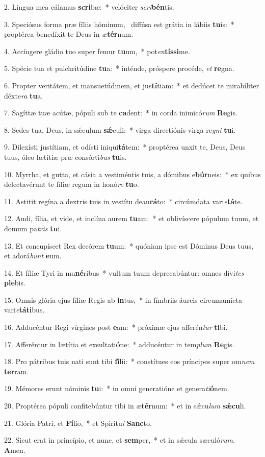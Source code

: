 2. Lingua mea cálamus \textbf{scri}bæ:~*  velóciter \textit{scri}\textbf{bén}tis.\

3. Speciósus forma præ fíliis hóminum, \dag\  diffúsa est grátia in lábiis \textbf{tu}is:~*  proptérea benedíxit te Deus in \textit{æ}\textbf{tér}num.\

4. Accíngere gládio tuo super femur \textbf{tu}um,~*  pot\textit{en}\textbf{tís}\textbf{si}me.\

5. Spécie tua et pulchritúdine \textbf{tu}a:~*  inténde, próspere procéde, \textit{et} \textbf{re}gna.\

6. Propter veritátem, et mansuetúdinem, et jus\textbf{tí}tiam:~*  et dedúcet te mirabíliter déxte\textit{ra} \textbf{tu}a.\

7. Sagíttæ tuæ acútæ, pópuli sub te \textbf{ca}dent:~*  in corda inimicó\textit{rum} \textbf{Re}gis.\

8. Sedes tua, Deus, in sǽculum \textbf{sǽ}culi:~*  virga directiónis virga re\textit{gni} \textbf{tu}i.\

9. Dilexísti justítiam, et odísti iniqui\textbf{tá}tem:~*  proptérea unxit te, Deus, Deus tuus, óleo lætítiæ præ consórti\textit{bus} \textbf{tu}is.\

10. Myrrha, et gutta, et cásia a vestiméntis tuis, a dómibus e\textbf{búr}neis:~*  ex quibus delectavérunt te fíliæ regum in honó\textit{re} \textbf{tu}o.\

11. Astitit regína a dextris tuis in vestítu deau\textbf{rá}to:~*  circúmdata vari\textit{e}\textbf{tá}te.\

12. Audi, fília, et vide, et inclína aurem \textbf{tu}am:~*  et oblivíscere pópulum tuum, et domum pa\textit{tris} \textbf{tu}i.\

13. Et concupíscet Rex decórem \textbf{tu}um:~*  quóniam ipse est Dóminus Deus tuus, et adorá\textit{bunt} \textbf{e}um.\

14. Et fíliæ Tyri in mu\textbf{né}ribus~*  vultum tuum deprecabúntur: omnes dívi\textit{tes} \textbf{ple}bis.\

15. Omnis glória ejus fíliæ Regis ab \textbf{in}tus,~*  in fímbriis áureis circumamícta vari\textit{e}\textbf{tá}\textbf{ti}bus.\

16. Adducéntur Regi vírgines post \textbf{e}am:~*  próximæ ejus afferén\textit{tur} \textbf{ti}bi.\

17. Afferéntur in lætítia et exsultati\textbf{ó}ne:~*  adducéntur in tem\textit{plum} \textbf{Re}gis.\

18. Pro pátribus tuis nati sunt tibi \textbf{fí}lii:~*  constítues eos príncipes super om\textit{nem} \textbf{ter}ram.\

19. Mémores erunt nóminis \textbf{tu}i:~*  in omni generatióne et genera\textit{ti}\textbf{ó}nem.\

20. Proptérea pópuli confitebúntur tibi in æ\textbf{tér}num:~*  et in sǽcu\textit{lum} \textbf{sǽ}\textbf{cu}li.\

21. Glória Patri, et \textbf{Fí}lio,~*  et Spirítu\textit{i} \textbf{Sanc}to.\

22. Sicut erat in princípio, et nunc, et \textbf{sem}per,~*  et in sǽcula sæculó\textit{rum}. \textbf{A}men.\

